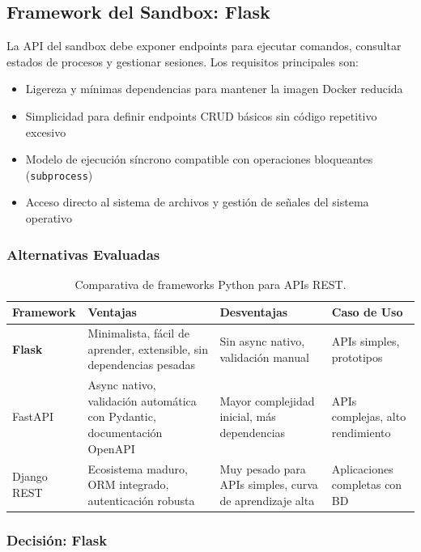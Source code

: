 \subsection{Framework del Sandbox: Flask}

La API del sandbox debe exponer endpoints para ejecutar comandos, consultar estados de procesos y gestionar sesiones. Los requisitos principales son:

\begin{itemize}
    \item Ligereza y mínimas dependencias para mantener la imagen Docker reducida
    \item Simplicidad para definir endpoints CRUD básicos sin código repetitivo excesivo
    \item Modelo de ejecución síncrono compatible con operaciones bloqueantes (\texttt{subprocess})
    \item Acceso directo al sistema de archivos y gestión de señales del sistema operativo
\end{itemize}

\subsubsection{Alternativas Evaluadas}

\begin{table}[H]
\centering
\renewcommand{\arraystretch}{1.2}
\begin{tabular}{|l|p{4cm}|p{4cm}|p{3cm}|}
\hline
\rowcolor[gray]{0.85}
\textbf{Framework} & \textbf{Ventajas} & \textbf{Desventajas} & \textbf{Caso de Uso} \\
\hline
\textbf{Flask} & Minimalista, fácil de aprender, extensible, sin dependencias pesadas & Sin async nativo, validación manual & APIs simples, prototipos \\
\hline
FastAPI & Async nativo, validación automática con Pydantic, documentación OpenAPI & Mayor complejidad inicial, más dependencias & APIs complejas, alto rendimiento \\
\hline
Django REST & Ecosistema maduro, ORM integrado, autenticación robusta & Muy pesado para APIs simples, curva de aprendizaje alta & Aplicaciones completas con BD \\
\hline
\end{tabular}
\caption{Comparativa de frameworks Python para APIs REST.}
\label{tab:frameworks_python}
\end{table}

\subsubsection{Decisión: Flask}

